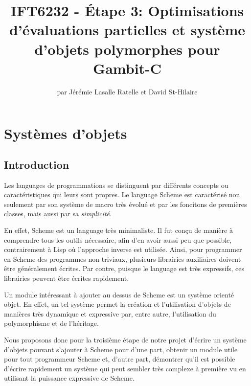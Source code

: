 \documentclass[letterpaper,12pt]{article}
\begin{document}
\title{IFT6232 - Étape 3: Optimisations d'évaluations partielles et
  système d'objets polymorphes pour Gambit-C}

\author{par Jérémie Lasalle Ratelle et David St-Hilaire}
\maketitle

\clearpage

\tableofcontents

\clearpage

\section{Systèmes d'objets}

\subsection{Introduction}

Les languages de programmations se distinguent par différents concepts
ou caractéristiques qui leurs sont propres. Le language Scheme est
caractérisé non seulement par son système de macro très évolué et par
les foncitons de premières classes, mais aussi par sa
\emph{simplicité}.

En effet, Scheme est un language très minimaliste. Il fut conçu de
manière à comprendre tous les outils nécessaire, afin d'en avoir aussi
peu que possible, contrairement à Lisp où l'approche inverse est
utilisée. Ainsi, pour programmer en Scheme des programmes non
triviaux, plusieurs librairies auxiliaires doivent être généralement
écrites. Par contre, puisque le language est très expressifs, ces
librairies peuvent être écrites rapidement.

Un module intéressant à ajouter au dessus de Scheme est un système
orienté objet. En effet, un tel système permet la création et
l'utilisation d'objets de manières très dynamique et expressive par,
entre autre, l'utilisation du polymorphisme et de l'héritage.

Nous proposons donc pour la troisième étape de notre projet d'écrire
un système d'objets pouvant s'ajouter à Scheme pour d'une part,
obtenir un module utile pour tout programmeur Scheme et, d'autre part,
démontrer qu'il est possible d'écrire rapidement un système qui peut
sembler très complexe à première vu en utilisant la puissance
expressive de Scheme.
\end{document}

